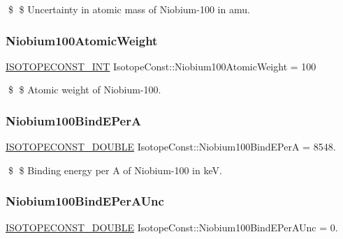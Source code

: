 \$ \$ Uncertainty in atomic mass of Niobium-\/100 in amu. \mbox{\label{group___isotope_const-_niobium-_nb100_ga28e634979a0fd5de5f8d7331c52a60d4}} 
\subsubsection{\texorpdfstring{Niobium100\+Atomic\+Weight}{Niobium100AtomicWeight}}
{\footnotesize\ttfamily \mbox{\hyperlink{group___isotope_const-_macros_ga5f18360b3e99483a35c32d789e62621c}{I\+S\+O\+T\+O\+P\+E\+C\+O\+N\+S\+T\+\_\+\+I\+NT}} Isotope\+Const\+::\+Niobium100\+Atomic\+Weight = 100}

\$ \$ Atomic weight of Niobium-\/100. \mbox{\label{group___isotope_const-_niobium-_nb100_ga37ccc4848441c11869b1962ed639e3f0}} 
\subsubsection{\texorpdfstring{Niobium100\+Bind\+E\+PerA}{Niobium100BindEPerA}}
{\footnotesize\ttfamily \mbox{\hyperlink{group___isotope_const-_macros_ga8f45a7272ce02c0b4c65c44636ed719a}{I\+S\+O\+T\+O\+P\+E\+C\+O\+N\+S\+T\+\_\+\+D\+O\+U\+B\+LE}} Isotope\+Const\+::\+Niobium100\+Bind\+E\+PerA = 8548.}

\$ \$ Binding energy per A of Niobium-\/100 in keV. \mbox{\label{group___isotope_const-_niobium-_nb100_ga33a5ee37bcfedcb79434d5f40e28c431}} 
\subsubsection{\texorpdfstring{Niobium100\+Bind\+E\+Per\+A\+Unc}{Niobium100BindEPerAUnc}}
{\footnotesize\ttfamily \mbox{\hyperlink{group___isotope_const-_macros_ga8f45a7272ce02c0b4c65c44636ed719a}{I\+S\+O\+T\+O\+P\+E\+C\+O\+N\+S\+T\+\_\+\+D\+O\+U\+B\+LE}} Isotope\+Const\+::\+Niobium100\+Bind\+E\+Per\+A\+Unc = 0.}

